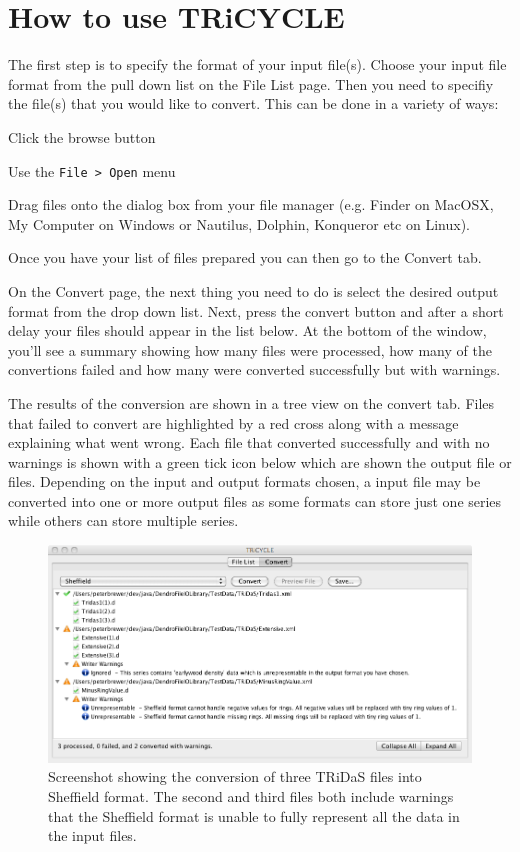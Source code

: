 \documentclass[10pt, headsepline,DIV14,BCOR0.5cm]{scrreprt}
\begin{document}
\chapter{How to use TRiCYCLE}

The first step is to specify the format of your input file(s). Choose your input file format from the pull
down list on the File List page. Then you need to specifiy the file(s) that you would like to convert. This
can be done in a variety of ways:

\begin{itemize*}
 \item Click the browse button
 \item Use the \verb|File > Open| menu
 \item Drag files onto the dialog box from your file manager (e.g. Finder on MacOSX, My Computer on
Windows or Nautilus, Dolphin, Konqueror etc on Linux).
\end{itemize*}

Once you have your list of files prepared you can then go to the Convert tab.


On the Convert page, the next thing you need to do is select the desired output format from the drop down
list. Next, press the convert button and after a short delay your files should appear in the list below. At the
bottom of the window, you'll see a summary showing how many files were processed, how many of the
convertions failed and how many were converted successfully but with warnings.


The results of the conversion are shown in a tree view on the convert tab. Files that failed to convert are
highlighted by a red cross along with a message explaining what went wrong. Each file that converted
successfully and with no warnings is shown with a green tick icon below which are shown the output file
or files. Depending on the input and output formats chosen, a input file may be converted into one or more
output files as some formats can store just one series while others can store multiple series.


\begin{figure}
\includegraphics[width=\textwidth]{screenshot1.png}
\caption{Screenshot showing the conversion of three TRiDaS files into Sheffield
format. The second and third files both include warnings that the Sheffield format
is unable to fully represent all the data in the input files.} 
\label{fig:screenshot}
\end{figure}
\end{document}
